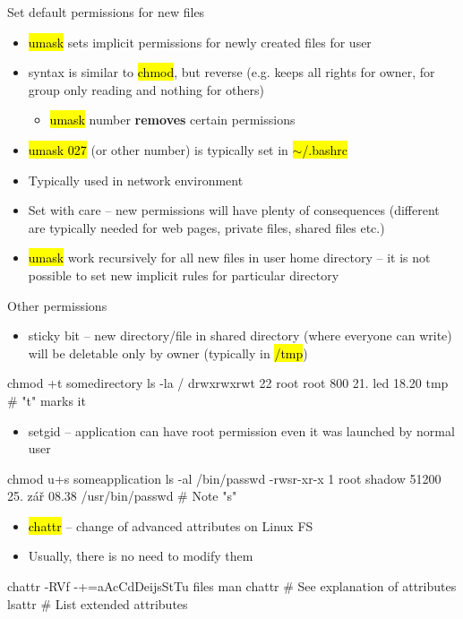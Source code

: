 \documentclass[compress, ucs, xelatex, 11pt, xcolor=svgnames,
  hyperref={
    bookmarks=true,
    unicode=true,
    colorlinks=true,
    pdftitle={Linux, command line and MetaCentrum},
    plainpages=false,
    pdfauthor={Vojtech Zeisek},
    pdfsubject={Course about use of Linux command line, writing shell scripts and using MetaCentrum of CESNET},
    pdfcreator={XeLaTeX},
    pdfkeywords={Linux, GNU, BASH, shell, command line, MetaCentrum},
    linkcolor=DarkRed,
    anchorcolor=DarkBlue,
    citecolor=Indigo,
    filecolor=NavyBlue,
    menucolor=DarkMagenta,
    urlcolor=DarkBlue,
    pdftex},
  url={hyphens, lowtilde} %
  ]{beamer}
\renewcommand{\texttt}[1]{\hl{\ttfamily #1}}
\begin{document}
\begin{frame}{Set default permissions for new files}
\begin{itemize}
  \item \texttt{umask} sets implicit permissions for newly created files for user
  \item syntax is similar to \texttt{chmod}, but reverse (e.g. \texttt{027} keeps all rights for owner, for group only reading and nothing for others)
  \begin{itemize}
    \item \texttt{umask} number \textbf{removes} certain permissions
  \end{itemize}
  \item \texttt{umask 027} (or other number) is typically set in \texttt{$\sim$/.bashrc}
  \item Typically used in network environment
  \item Set with care -- new permissions will have plenty of consequences (different are typically needed for web pages, private files, shared files etc.)
  \item \texttt{umask} work recursively for all new files in user home directory -- it is not possible to set new implicit rules for particular directory
\end{itemize}
\end{frame}

\begin{frame}[fragile]{Other permissions}
\begin{itemize}
  \item sticky bit -- new directory/file in shared directory (where everyone can write) will be deletable only by owner (typically in \texttt{/tmp})
\end{itemize}
  \begin{bashcode}
    chmod +t somedirectory
    ls -la /
    drwxrwxrwt 22 root root 800 21. led 18.20 tmp # "t" marks it
  \end{bashcode}
\begin{itemize}
  \item setgid -- application can have root permission even it was launched by normal user
\end{itemize}
  \begin{bashcode}
    chmod u+s someapplication
    ls -al /bin/passwd
    -rwsr-xr-x 1 root shadow 51200 25. zář 08.38 /usr/bin/passwd # Note "s"
  \end{bashcode}
\begin{itemize}
  \item \texttt{chattr} -- change of advanced attributes on Linux FS
  \item Usually, there is no need to modify them
\end{itemize}
  \begin{bashcode}
    chattr -RVf -+=aAcCdDeijsStTu files
    man chattr # See explanation of attributes
    lsattr # List extended attributes
  \end{bashcode}
\end{frame}
\end{document}
